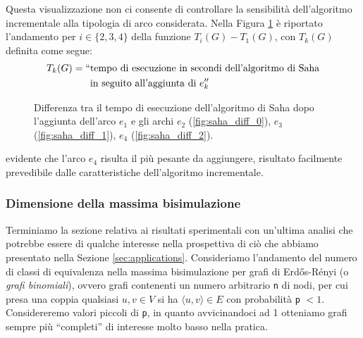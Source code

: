 Questa visualizzazione non ci consente di controllare la sensibilità dell'algoritmo incrementale alla tipologia di arco considerata. Nella Figura \ref{fig:saha_depends_cycle} è riportato l'andamento per $i \in \{2,3,4\}$ della funzione $T_i(G) - T_1(G)$, con $T_k(G)$ definita come segue:
\begin{align*}
    T_k(G) = ``&\text{tempo di esecuzione in secondi dell'algoritmo di Saha}\\
    &\text{in seguito all'aggiunta di } e_k''
\end{align*}

\begin{figure}[H]
    \caption{Differenza tra il tempo di esecuzione dell'algoritmo di Saha dopo l'aggiunta dell'arco $e_1$ e gli archi $e_2$ (\ref*{fig:saha_diff_0}), $e_3$ (\ref*{fig:saha_diff_1}), $e_4$ (\ref*{fig:saha_diff_2}).}
    \label{fig:saha_depends_cycle}
\end{figure}

\accente evidente che l'arco $e_4$ risulta il più pesante da aggiungere, risultato facilmente prevedibile dalle caratteristiche dell'algoritmo incrementale.

\subsubsection{Dimensione della massima bisimulazione}
Terminiamo la sezione relativa ai risultati sperimentali con un'ultima analisi che potrebbe essere di qualche interesse nella prospettiva di ciò che abbiamo presentato nella Sezione \ref{sec:applications}. Consideriamo l'andamento del numero di classi di equivalenza nella massima bisimulazione per grafi di Erdős-Rényi (o \emph{grafi binomiali}), ovvero grafi contenenti un numero arbitrario \verb|n| di nodi, per cui presa una coppia qualsiasi $u,v \in V$ si ha $\langle u,v\rangle \in E$ con probabilità \verb|p| $< 1$.
Considereremo valori piccoli di \verb|p|, in quanto avvicinandoci ad 1 otteniamo grafi sempre più ``completi'' di interesse molto basso nella pratica.

